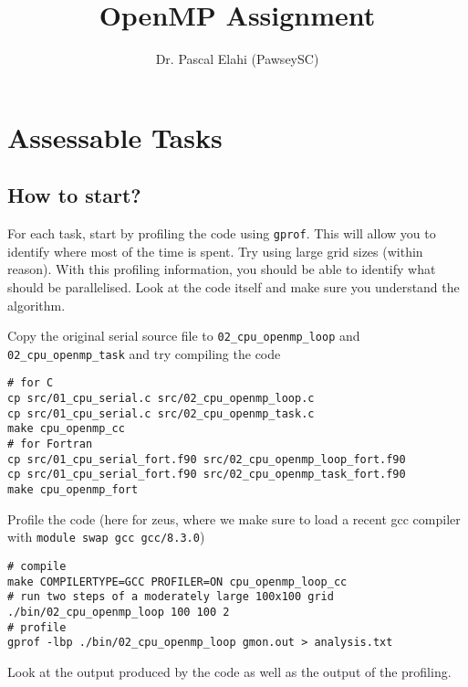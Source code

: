 \documentclass[11pt]{amsart}
\title[OpenMP]{OpenMP Assignment}
\author[]{Dr. Pascal Elahi (PawseySC)}
\begin{document}
\maketitle
\pagestyle{plain}


\newpage
\section{Assessable Tasks}\label{sec:tasks}
\subsection*{How to start?\nopunct\\} \label{sec:tasks:staring}
For each task, start by profiling the code using \texttt{gprof}. This will allow you to identify where most of the time is spent. Try using large grid sizes (within reason). With this profiling information, you should be able to identify what should be parallelised. Look at the code itself and make sure you understand the algorithm. 

Copy the original serial source file to \texttt{02\_cpu\_openmp\_loop} and \texttt{02\_cpu\_openmp\_task} and try compiling the code 
\begin{center}
\begin{minipage}{0.95\textwidth}
\begin{verbatim}
# for C
cp src/01_cpu_serial.c src/02_cpu_openmp_loop.c 
cp src/01_cpu_serial.c src/02_cpu_openmp_task.c 
make cpu_openmp_cc
# for Fortran
cp src/01_cpu_serial_fort.f90 src/02_cpu_openmp_loop_fort.f90 
cp src/01_cpu_serial_fort.f90 src/02_cpu_openmp_task_fort.f90
make cpu_openmp_fort
\end{verbatim}
\end{minipage}
\end{center}
Profile the code (here for zeus, where we make sure to load a recent gcc compiler with \texttt{module swap gcc gcc/8.3.0})
\begin{center}
\begin{minipage}{0.95\textwidth}
\begin{verbatim}
# compile 
make COMPILERTYPE=GCC PROFILER=ON cpu_openmp_loop_cc  
# run two steps of a moderately large 100x100 grid
./bin/02_cpu_openmp_loop 100 100 2 
# profile 
gprof -lbp ./bin/02_cpu_openmp_loop gmon.out > analysis.txt
\end{verbatim}
\end{minipage}
\end{center}
Look at the output produced by the code as well as the output of the profiling. 
\end{document}
